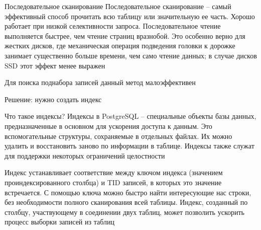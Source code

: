 \documentclass[12pt]{article}
\begin{document}
\begin{defin}{Последовательное сканирование}
    Последовательное сканирование -- самый эффективный способ прочитать всю таблицу или значительную ее часть. Хорошо работает при низкой селективности запроса. Последовательное чтение выполняется быстрее, чем чтение страниц вразнобой. Это особенно верно для жестких дисков, где механическая операция подведения головки к дорожке занимает существенно больше времени, чем само чтение данных; в случае дисков SSD этот эффект менее выражен 

    Для поиска поднабора записей данный метод малоэффективен 

    Решение: нужно создать индекс
\end{defin}

\begin{defin}{Что такое индексы?}
    Индексы в PostgreSQL -- специальные объекты базы данных, предназначенные в основном для ускорения доступа к данным. Это вспомогательные структуры, сохраняемые в отдельных файлах. Их можно удалить и восстановить заново по информации в таблице. Индексы также служат для поддержки некоторых ограничений целостности

    Индекс устанавливает соответствие между ключом индекса (значением проиндексированного столбца) и TID записей, в которых это значение встречается. С помощью ключа можно быстро найти интересующие нас строки, без необходимости полного сканирования всей таблицы. Индекс, созданный по столбцу, участвующему в соединении двух таблиц, может позволить ускорить процесс выборки записей из таблиц
\end{defin}
\end{document}
